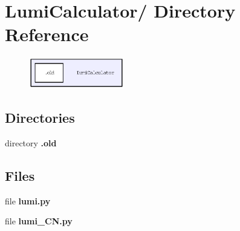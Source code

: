 \section{Lumi\-Calculator/ Directory Reference}
\label{dir_b78db51d8565e792c978f760a930b7fc}


\begin{figure}[H]
\begin{center}
\leavevmode
\includegraphics[width=118pt]{dir_b78db51d8565e792c978f760a930b7fc_dep}
\end{center}
\end{figure}
\subsection*{Directories}
\begin{CompactItemize}
\item 
directory \bf{.old}
\end{CompactItemize}
\subsection*{Files}
\begin{CompactItemize}
\item 
file \textbf{lumi.py}
\item 
file \textbf{lumi\_\-CN.py}
\end{CompactItemize}
